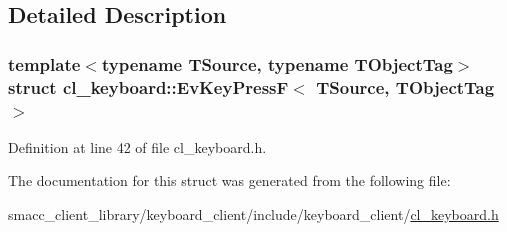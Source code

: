 \subsection{Detailed Description}
\subsubsection*{template$<$typename T\+Source, typename T\+Object\+Tag$>$\newline
struct cl\+\_\+keyboard\+::\+Ev\+Key\+Press\+F$<$ T\+Source, T\+Object\+Tag $>$}



Definition at line 42 of file cl\+\_\+keyboard.\+h.



The documentation for this struct was generated from the following file\+:\begin{DoxyCompactItemize}
\item 
smacc\+\_\+client\+\_\+library/keyboard\+\_\+client/include/keyboard\+\_\+client/\hyperlink{cl__keyboard_8h}{cl\+\_\+keyboard.\+h}\end{DoxyCompactItemize}
